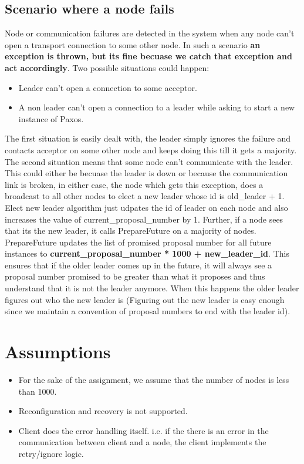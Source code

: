 \documentclass[letterpaper]{article}
\begin{document}
\subsection{Scenario where a node fails}
Node or communication failures are detected in the system when any node can't open a transport connection to some other node. In such a scenario \textbf{an exception is thrown, but its fine becuase we catch that exception and act accordingly}. Two possible situations could happen:
\begin{itemize}
\item Leader can't open a connection to some acceptor. 
\item A non leader can't open a connection to a leader while asking to start a new instance of Paxos.
\end{itemize}
The first situation is easily dealt with, the leader simply ignores the failure and contacts acceptor on some other node and keeps doing this till it gets a majority. The second situation means that some node can't communicate with the leader. This could either be becuase the leader is down or because the communication link is broken, in either case, the node which gets this exception, does a broadcast to all other nodes to elect a new leader whose id is old\_leader + 1. Elect new leader algorithm just udpates the id of leader on each node and also increases the value of current\_proposal\_number by 1. Further, if a node sees that its the new leader, it calls PrepareFuture on a majority of nodes. PrepareFuture updates the list of promised proposal number for all future instances to \textbf{current\_proposal\_number * 1000 + new\_leader\_id}. This ensures that if the older leader comes up in the future, it will always see a proposal number promised to be greater than what it proposes and thus understand that it is not the leader anymore. When this happens the older leader figures out who the new leader is (Figuring out the new leader is easy enough since we maintain a convention of proposal numbers to end with the leader id).

\section{Assumptions}
\begin{itemize}
\item For the sake of the assignment, we assume that the number of nodes is less than 1000.
\item Reconfiguration and recovery is not supported.
\item Client does the error handling itself. i.e. if the there is an error in the communication between client and a node, the client implements the retry/ignore logic.
\end{itemize}
\end{document}
